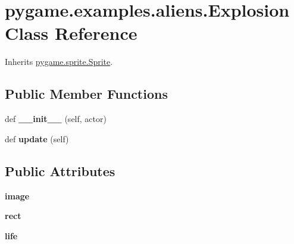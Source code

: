 \hypertarget{classpygame_1_1examples_1_1aliens_1_1_explosion}{}\section{pygame.\+examples.\+aliens.\+Explosion Class Reference}
\label{classpygame_1_1examples_1_1aliens_1_1_explosion}


Inherits \hyperlink{classpygame_1_1sprite_1_1_sprite}{pygame.\+sprite.\+Sprite}.

\subsection*{Public Member Functions}
\begin{DoxyCompactItemize}
\item 
\mbox{\label{classpygame_1_1examples_1_1aliens_1_1_explosion_a3cd10911f3cd6091ad68ea82253f2251}} 
def {\bfseries \+\_\+\+\_\+init\+\_\+\+\_\+} (self, actor)
\item 
\mbox{\label{classpygame_1_1examples_1_1aliens_1_1_explosion_a5dd318b85cdb54b5d8923f85e8b0cbbd}} 
def {\bfseries update} (self)
\end{DoxyCompactItemize}
\subsection*{Public Attributes}
\begin{DoxyCompactItemize}
\item 
\mbox{\label{classpygame_1_1examples_1_1aliens_1_1_explosion_a3640a22d185d1195350950578b9ca37d}} 
{\bfseries image}
\item 
\mbox{\label{classpygame_1_1examples_1_1aliens_1_1_explosion_a407f3a4e955986df8d29c205a7ad0104}} 
{\bfseries rect}
\item 
\mbox{\label{classpygame_1_1examples_1_1aliens_1_1_explosion_a599f85765cc798550c4ced98a2ffd981}} 
{\bfseries life}
\end{DoxyCompactItemize}
